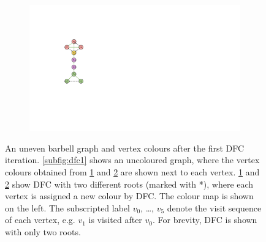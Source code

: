 \begin{figure}[t!]
\begin{subfigure}{.245\columnwidth}
\subcaption{}
\label{subfig:dfc2}
\end{subfigure}
\hfill
\begin{subfigure}{.245\columnwidth}
\includegraphics[clip,width=\textwidth]{figures/dfc3_new.pdf}
\subcaption{}
\label{subfig:dfc3}
\end{subfigure}
\caption{
An uneven barbell graph and vertex colours after the first DFC iteration. 
\ref{subfig:dfc1} shows an uncoloured graph, where the vertex colours obtained from \ref{subfig:dfc2} and \ref{subfig:dfc3} are shown next to each vertex.
\ref{subfig:dfc2} and \ref{subfig:dfc3} show DFC with two different roots (marked with *), where each vertex is assigned a new colour by DFC. The colour map is shown on the left.
The subscripted label $v_0$, \dots, $v_5$ denote the visit sequence of each vertex, e.g. $v_1$ is visited after $v_0$.
For brevity, DFC is shown with only two roots.
} 
\label{fig:dfc}
\end{figure}


